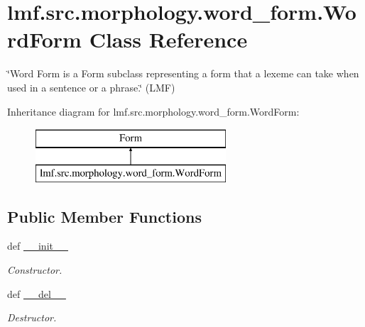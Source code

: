 \hypertarget{classlmf_1_1src_1_1morphology_1_1word__form_1_1_word_form}{\section{lmf.\+src.\+morphology.\+word\+\_\+form.\+Word\+Form Class Reference}
\label{classlmf_1_1src_1_1morphology_1_1word__form_1_1_word_form}
}


\char`\"{}\+Word Form is a Form subclass representing a form that a lexeme can take when used in a sentence or a phrase.\char`\"{} (L\+M\+F)  


Inheritance diagram for lmf.\+src.\+morphology.\+word\+\_\+form.\+Word\+Form\+:\begin{figure}[H]
\begin{center}
\leavevmode
\includegraphics[height=2.000000cm]{classlmf_1_1src_1_1morphology_1_1word__form_1_1_word_form}
\end{center}
\end{figure}
\subsection*{Public Member Functions}
\begin{DoxyCompactItemize}
\item 
def \hyperlink{classlmf_1_1src_1_1morphology_1_1word__form_1_1_word_form_afcc4ec0d271e48a7f35920a1e91aa9b9}{\+\_\+\+\_\+init\+\_\+\+\_\+}
\begin{DoxyCompactList}\small\item\em Constructor. \end{DoxyCompactList}\item 
def \hyperlink{classlmf_1_1src_1_1morphology_1_1word__form_1_1_word_form_aa7b79f6c8c3bd98e57b7d2bc60a9b88c}{\+\_\+\+\_\+del\+\_\+\+\_\+}
\begin{DoxyCompactList}\small\item\em Destructor. \end{DoxyCompactList}\end{DoxyCompactItemize}
